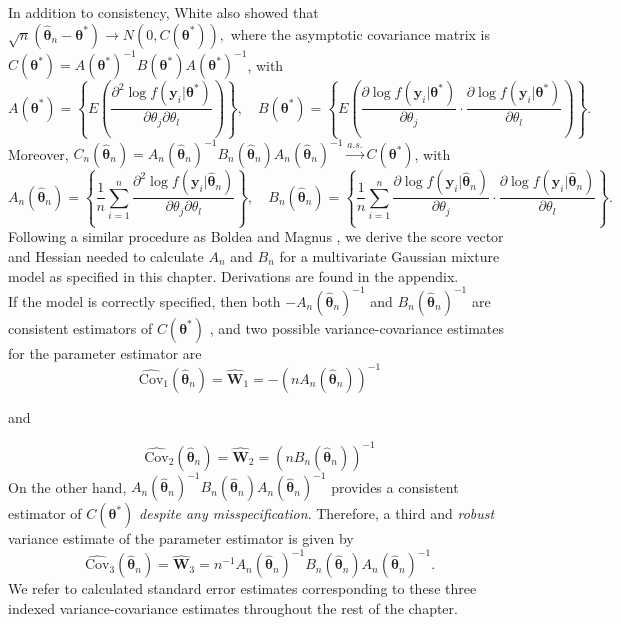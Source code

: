 \documentclass[10pt]{article}
\newcommand{\B}[0]{\mathbf}
\newcommand{\bs}[0]{\boldsymbol}
\begin{document}
In addition to consistency, White \cite{white1982} also showed that $\sqrt{n}(\hat{\bs\theta}_{n}-\bs\theta^{*})\rightarrow N(0, C(\bs\theta^{*})),$ where the asymptotic covariance matrix is
$C(\bs\theta^{*})=A(\bs\theta^{*})^{-1}B(\bs\theta^{*})A(\bs\theta^{*})^{-1}$, with
$$A(\bs\theta^{*})=\left\{E\left(\frac{\partial^{2}\log f(\B y_{i}|\bs\theta^{*})}{\partial \theta_{j}\partial\theta_{l}}\right)\right\},\quad B(\bs\theta^{*})=\left\{E\left(\frac{\partial\log f(\B y_{i}|\bs\theta^{*})}{\partial \theta_{j}}\cdot \frac{\partial\log f(\B y_{i}|\bs\theta^{*})}{\partial \theta_{l}}\right)\right\}.$$
Moreover, $C_{n}(\hat{\bs\theta}_{n})=A_{n}(\hat{\bs\theta}_{n})^{-1}B_{n}(\hat{\bs\theta}_{n})A_{n}(\hat{\bs\theta}_{n})^{-1}\stackrel{a.s.}{\rightarrow} C(\bs\theta^{*})$, with
$$A_{n}(\hat{\bs\theta}_{n})=\left\{\frac{1}{n}\sum^{n}_{i=1}\frac{\partial^{2}\log f(\B y_{i}|\hat{\bs\theta}_{n})}{\partial \theta_{j}\partial\theta_{l}}\right\},\quad B_{n}(\hat{\bs\theta}_{n})=\left\{\frac{1}{n}\sum^{n}_{i=1}\frac{\partial\log f(\B y_{i}|\hat{\bs\theta}_{n})}{\partial \theta_{j}}\cdot \frac{\partial\log f(\B y_{i}|\hat{\bs\theta}_{n})}{\partial \theta_{l}}\right\}.$$
 Following a similar procedure as Boldea and Magnus \cite{boldea2009}, we derive the score vector and Hessian needed to calculate $A_{n}$ and $B_{n}$ for a multivariate Gaussian mixture model as specified in this chapter. Derivations are found in the appendix.\\
 
If the model is correctly specified, then both $-A_{n}(\hat{\bs\theta}_{n})^{-1}$ and $B_{n}(\hat{\bs\theta}_{n})^{-1}$ are consistent estimators of $C(\bs\theta^{*})$ \cite{white1982}, and two possible variance-covariance estimates for the parameter estimator are
$$\widehat{\text{Cov}}_{1}(\hat{\bs\theta}_{n}) = \widehat{\B W}_{1}=-(nA_{n}(\hat{\bs\theta}_{n}))^{-1}$$
\begin{center}and\end{center}
$$\widehat{\text{Cov}}_{2}(\hat{\bs\theta}_{n})= \widehat{\B W}_{2}=(nB_{n}(\hat{\bs\theta}_{n}))^{-1}$$
On the other hand, $A_{n}(\hat{\bs\theta}_{n})^{-1}B_{n}(\hat{\bs\theta}_{n})A_{n}(\hat{\bs\theta}_{n})^{-1}$ provides a consistent estimator of $C(\bs\theta^{*})$ {\em despite any misspecification}. Therefore, a third and {\em robust} variance estimate of the parameter estimator is given by
$$\widehat{\text{Cov}}_{3}(\hat{\bs\theta}_{n})= \widehat{\B W}_{3}=n^{-1}A_{n}(\hat{\bs\theta}_{n})^{-1}B_{n}(\hat{\bs\theta}_{n})A_{n}(\hat{\bs\theta}_{n})^{-1}.$$
 We refer to calculated standard error estimates corresponding to these three indexed variance-covariance estimates throughout the rest of the chapter.
\end{document}
